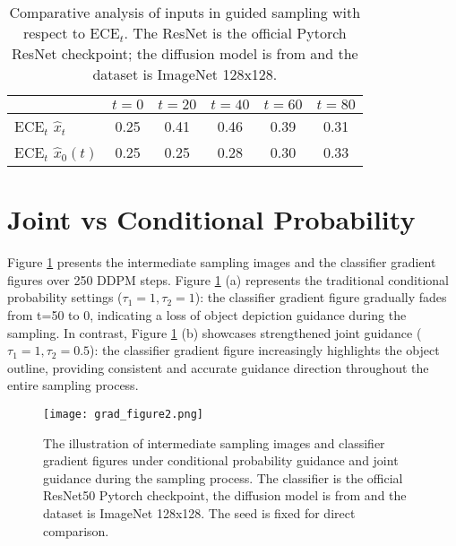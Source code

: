 \documentclass{article}
\theoremstyle{definition}
\begin{document}
\begin{table}[h!]
\caption{Comparative analysis of inputs in guided sampling with respect to $\text{ECE}_t$. The ResNet is the official Pytorch ResNet checkpoint; the diffusion model is from \cite{dhariwal2021diffusion} and the dataset is ImageNet 128x128.}
\label{table:compare_xt_x0_ece}
\begin{center}
\begin{small}
\begin{sc}
\begin{tabular}{lccccc}
\toprule
     & $t=0$ & $t=20$ & $t=40$ & $t=60$ & $t=80$  \\
\midrule     
$\text{ECE}_t$ $\hat{x}_t$  & 0.25 & 0.41 & 0.46 & 0.39 & 0.31\\
$\text{ECE}_t$ $\hat{x}_0(t)$ &0.25& 0.25& 0.28&0.30& 0.33\\
\bottomrule
\end{tabular}
\end{sc}
\end{small}
\end{center}
\end{table}







\section{Joint vs Conditional Probability}

Figure \ref{fig:grad_figure2} presents the intermediate sampling images and the classifier gradient figures over 250 DDPM steps. Figure \ref{fig:grad_figure2} (a) represents the traditional conditional probability settings ($\tau_1=1,\tau_2=1$): the classifier gradient figure gradually fades from t=50 to 0, indicating a loss of object depiction guidance during the sampling. In contrast, Figure \ref{fig:grad_figure2} (b) 
showcases strengthened joint guidance ($\tau_1=1,\tau_2=0.5$): the classifier gradient figure increasingly highlights the object outline, providing consistent and accurate guidance direction throughout the entire sampling process.


\begin{figure}[h]
  \centering
\texttt{[image: grad\_figure2.png]}
  \caption{The illustration of intermediate sampling images and classifier gradient figures under conditional probability guidance and joint guidance during the sampling process.  The classifier is the official ResNet50 Pytorch checkpoint, the diffusion model is from \cite{dhariwal2021diffusion} and the dataset is ImageNet 128x128. The seed is fixed for direct comparison.}
  \label{fig:grad_figure2}
\end{figure}
\end{document}
